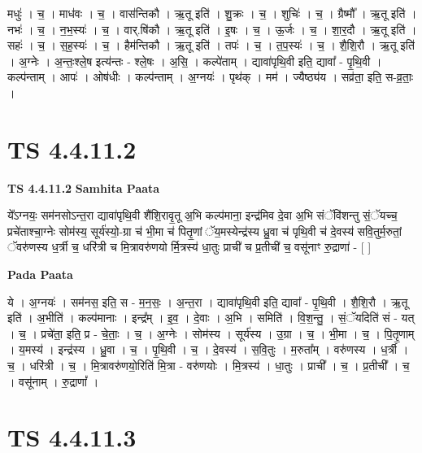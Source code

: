 \documentclass[17pt]{extarticle}
\begin{document}
मधुः॑ । च॒ । माध॑वः । च॒ । वास॑न्तिकौ । ऋ॒तू इति॑ । शु॒क्रः । च॒ । शुचिः॑ । च॒ । ग्रैष्मौ᳚ । ऋ॒तू इति॑ । नभः॑ । च॒ । न॒भ॒स्यः॑ । च॒ । वार्.षि॑कौ । ऋ॒तू इति॑ । इ॒षः । च॒ । ऊ॒र्जः । च॒ । शा॒र॒दौ । ऋ॒तू इति॑ । सहः॑ । च॒ । स॒ह॒स्यः॑ । च॒ । हैम॑न्तिकौ । ऋ॒तू इति॑ । तपः॑ । च॒ । त॒प॒स्यः॑ । च॒ । शै॒शि॒रौ । ऋ॒तू इति॑ । अ॒ग्नेः । अ॒न्तः॒श्ले॒ष इत्य॑न्तः - श्ले॒षः । अ॒सि॒ । कल्पे॑ताम् । द्यावा॑पृथि॒वी इति॒ द्यावा᳚ - पृ॒थि॒वी । कल्प॑न्ताम् । आपः॑ । ओष॑धीः । कल्प॑न्ताम् । अ॒ग्नयः॑ । पृथ॑क् । मम॑ । ज्यैष्ठ्य॑य । सव्र॑ता॒ इति॒ स-व्र॒ताः॒ ।  \newline





\section{ TS 4.4.11.2 }

\textbf{TS 4.4.11.2 } \newline
\textbf{Samhita Paata} \newline

ये᳚ऽग्नयः॒ सम॑नसोऽन्त॒रा द्यावा॑पृथि॒वी शै॑शि॒रावृ॒तू अ॒भि कल्प॑माना॒ इन्द्र॑मिव दे॒वा अ॒भि संॅवि॑शन्तु सं॒ॅयच्च॒ प्रचे॑ताश्चा॒ग्नेः सोम॑स्य॒ सूर्य॑स्यो॒-ग्रा च॑ भी॒मा च॑ पितृ॒णां ॅय॒मस्येन्द्र॑स्य ध्रु॒वा च॑ पृथि॒वी च॑ दे॒वस्य॑ सवि॒तुर्म॒रुतां॒ ॅवरु॑णस्य ध॒र्त्री च॒ धरि॑त्री च मि॒त्रावरु॑णयो र्मि॒त्रस्य॑ धा॒तुः प्राची॑ च प्र॒तीची॑ च॒ वसू॑नाꣳ रु॒द्राणा॑ - [  ] \newline

\textbf{Pada Paata} \newline

ये । अ॒ग्नयः॑ । सम॑नस॒ इति॒ स - म॒न॒सः॒ । अ॒न्त॒रा । द्यावा॑पृथि॒वी इति॒ द्यावा᳚ - पृ॒थि॒वी । शै॒शि॒रौ । ऋ॒तू इति॑ । अ॒भीति॑ । कल्प॑मानाः । इन्द्र᳚म् । इ॒व॒ । दे॒वाः । अ॒भि । समिति॑ । वि॒श॒न्तु॒ । सं॒ॅयदिति॑ सं - यत् । च॒ । प्रचे॑ता॒ इति॒ प्र - चे॒ताः॒ । च॒ । अ॒ग्नेः । सोम॑स्य । सूर्य॑स्य । उ॒ग्रा । च॒ । भी॒मा । च॒ । पि॒तृ॒णाम् । य॒मस्य॑ । इन्द्र॑स्य । ध्रु॒वा । च॒ । पृ॒थि॒वी । च॒ । दे॒वस्य॑ । स॒वि॒तुः । म॒रुता᳚म् । वरु॑णस्य । ध॒र्त्री । च॒ । धरि॑त्री । च॒ । मि॒त्रावरु॑णयो॒रिति॑ मि॒त्रा - वरु॑णयोः । मि॒त्रस्य॑ । धा॒तुः । प्राची᳚ । च॒ । प्र॒तीची᳚ । च॒ । वसू॑नाम् । रु॒द्राणां᳚ ।  \newline





\section{ TS 4.4.11.3 }
\end{document}
